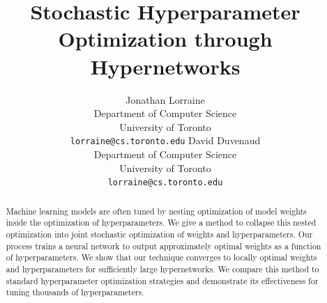 \documentclass{article} %
\title{Stochastic Hyperparameter Optimization through Hypernetworks}
\author{
  Jonathan Lorraine\\
  Department of Computer Science\\
  University of Toronto\\
  \texttt{lorraine@cs.toronto.edu}
  \And
  David Duvenaud\\
  Department of Computer Science\\
  University of Toronto\\
  \texttt{lorraine@cs.toronto.edu}
}
\begin{document}
\maketitle

\begin{abstract}
Machine learning models are often tuned by nesting optimization of model weights inside the optimization of hyperparameters.
We give a method to collapse this nested optimization into joint stochastic optimization of weights and hyperparameters.
Our process trains a neural network to output approximately optimal weights as a function of hyperparameters.
We show that our technique converges to locally optimal weights and hyperparameters for sufficiently large hypernetworks.
We compare this method to standard hyperparameter optimization strategies and demonstrate its effectiveness for tuning thousands of hyperparameters.
\end{abstract}
%
\end{document}
